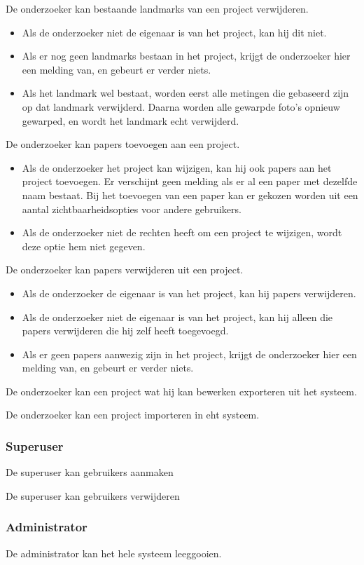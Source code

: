 De onderzoeker kan bestaande landmarks van een project verwijderen.
\begin{itemize}
	\item Als de onderzoeker niet de eigenaar is van het project, kan hij dit niet.
	\item Als er nog geen landmarks bestaan in het project, krijgt de onderzoeker hier een melding van, en gebeurt er verder niets.
	\item Als het landmark wel bestaat, worden eerst alle metingen die gebaseerd zijn op dat landmark verwijderd. Daarna worden alle gewarpde foto's opnieuw gewarped, en wordt het landmark echt verwijderd.
\end{itemize}

De onderzoeker kan papers toevoegen aan een project.
\begin{itemize}
	\item Als de onderzoeker het project kan wijzigen, kan hij ook papers aan het project toevoegen. Er verschijnt geen melding als er al een paper met dezelfde naam bestaat. Bij het toevoegen van een paper kan er gekozen worden uit een aantal zichtbaarheidsopties voor andere gebruikers.
	\item Als de onderzoeker niet de rechten heeft om een project te wijzigen, wordt deze optie hem niet gegeven.
\end{itemize}

De onderzoeker kan papers verwijderen uit een project.
\begin{itemize}
	\item Als de onderzoeker de eigenaar is van het project, kan hij papers verwijderen.
	\item Als de onderzoeker niet de eigenaar is van het project, kan hij alleen die papers verwijderen die hij zelf heeft toegevoegd.
	\item Als er geen papers aanwezig zijn in het project, krijgt de onderzoeker hier een melding van, en gebeurt er verder niets.
\end{itemize}

De onderzoeker kan een project wat hij kan bewerken exporteren uit het systeem.

De onderzoeker kan een project importeren in eht systeem.

\subsubsection{Superuser}

De superuser kan gebruikers aanmaken

De superuser kan gebruikers verwijderen

\subsubsection{Administrator}

De administrator kan het hele systeem leeggooien.